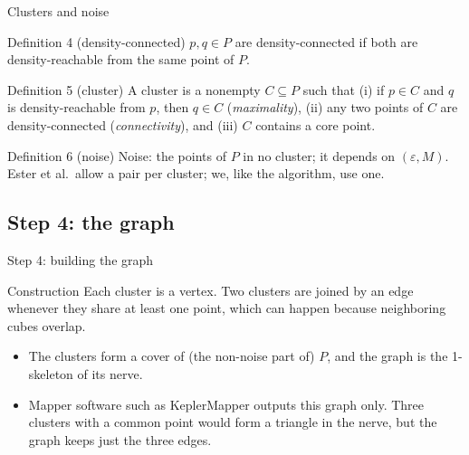 \documentclass[aspectratio=169]{beamer}
\newcommand{\src}[1]{\par\vspace{2pt}\hfill{\scriptsize\textcolor{gray}{\parencite{#1}}}}
\begin{document}
\begin{frame}{Clusters and noise}
\begin{block}{Definition 4 (density-connected)}
$p, q \in P$ are density-connected if both are density-reachable from the same point of $P$.
\src{ester1996dbscan}
\end{block}
\begin{block}{Definition 5 (cluster)}
A \alert{cluster} is a nonempty $C \subseteq P$ such that
(i) if $p \in C$ and $q$ is density-reachable from $p$, then $q \in C$ (\emph{maximality}),
(ii) any two points of $C$ are density-connected (\emph{connectivity}), and
(iii) $C$ contains a core point.
\src{ester1996dbscan}
\end{block}
\begin{block}{Definition 6 (noise)}
\alert{Noise}: the points of $P$ in no cluster; it depends on $(\varepsilon, M)$. Ester et al.\ allow a pair per cluster; we, like the algorithm, use one.
\end{block}
\end{frame}

\subsection{Step 4: the graph}
\begin{frame}{Step 4: building the graph}
\begin{block}{Construction}
Each cluster is a vertex. Two clusters are joined by an edge whenever they share at least one point, which can happen because neighboring cubes overlap.
\src{singh2007mapper}
\end{block}
\begin{itemize}
  \item The clusters form a cover of (the non-noise part of) $P$, and the graph is the \alert{1-skeleton of its nerve}.
  \item Mapper software such as KeplerMapper outputs this graph only. Three clusters with a common point would form a triangle in the nerve, but the graph keeps just the three edges.
\end{itemize}
\end{frame}
\end{document}
